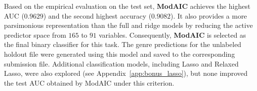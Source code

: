 Based on the empirical evaluation on the test set, \textbf{ModAIC} achieves the highest AUC (\(0.9629\)) and the second highest accuracy (\(0.9082\)). It also provides a more parsimonious representation than the full and ridge models by reducing the active predictor space from \(165\) to \(91\) variables. Consequently, \textbf{ModAIC} is selected as the final binary classifier for this task. The genre predictions for the unlabeled holdout file were generated using this model and saved to the corresponding submission file. Additional classification models, including Lasso and Relaxed Lasso, were also explored (see Appendix~\ref{app:bonus_lasso}), but none improved the test AUC obtained by ModAIC under this criterion.
